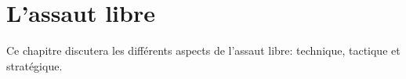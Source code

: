 \chapter{L'assaut libre}\label{ch:assaut}

Ce chapitre discutera les différents aspects de l'assaut libre: technique, tactique et stratégique.